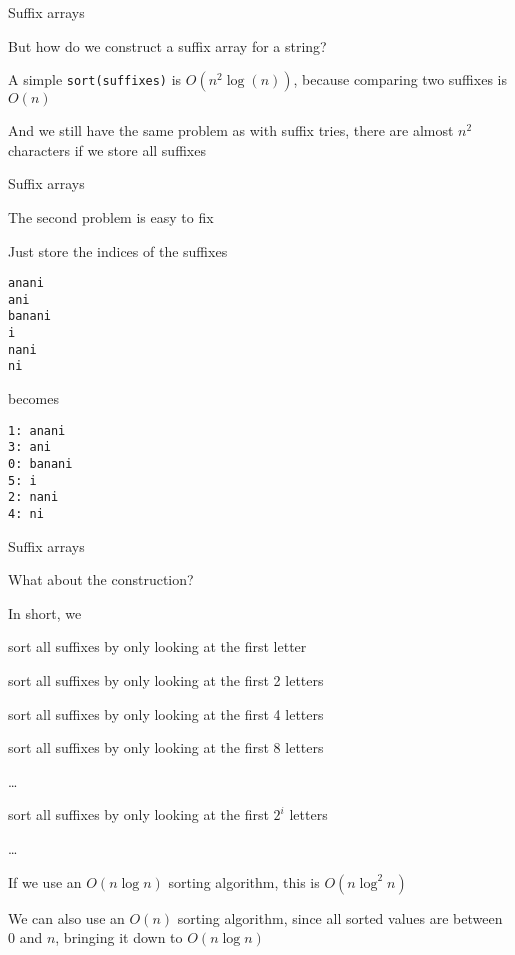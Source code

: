 \begin{frame}{Suffix arrays}
    \bi
        \item But how do we construct a suffix array for a string?
            \vspace{10pt}
        \item A simple \texttt{sort(suffixes)} is $O(n^2\log(n))$, because comparing two suffixes is $O(n)$
        \item And we still have the same problem as with suffix tries, there are almost $n^2$ characters if we store all suffixes
    \ei
\end{frame}

\begin{frame}[fragile]{Suffix arrays}
    \bi
        \item The second problem is easy to fix
        \item Just store the indices of the suffixes
    \ei
    \begin{verbatim}
anani
ani
banani
i
nani
ni
    \end{verbatim}
    \bi
        \item becomes
    \ei
    \begin{verbatim}
1: anani
3: ani
0: banani
5: i
2: nani
4: ni
    \end{verbatim}
\end{frame}

\begin{frame}{Suffix arrays}
    \bi
        \item What about the construction?
        \item In short, we
            \bi
                \item sort all suffixes by only looking at the first letter
                \item sort all suffixes by only looking at the first 2 letters
                \item sort all suffixes by only looking at the first 4 letters
                \item sort all suffixes by only looking at the first 8 letters
                \item \ldots
                \item sort all suffixes by only looking at the first $2^i$ letters
                \item \ldots
            \ei
        \vspace{10pt}
    \item If we use an $O(n\log n)$ sorting algorithm, this is $O(n\log^2 n)$
    \item We can also use an $O(n)$ sorting algorithm, since all sorted values are between $0$ and $n$, bringing it down to $O(n \log n)$
    \ei
\end{frame}

